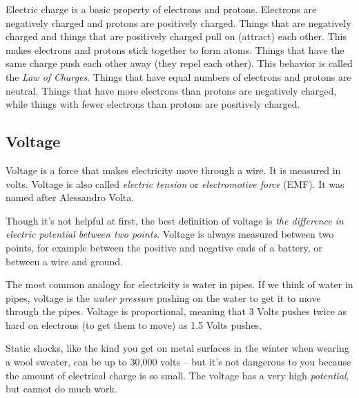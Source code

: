 Electric charge is a basic property of electrons and protons. Electrons are negatively charged and protons are positively charged. Things that are negatively charged and things that are positively charged pull on (attract) each other. This makes electrons and protons stick together to form atoms. Things that have the same charge push each other away (they repel each other). This behavior is called the \emph{Law of Charges}. Things that have equal numbers of electrons and protons are neutral. Things that have more electrons than protons are negatively charged, while things with fewer electrons than protons are positively charged. 



\subsection*{Voltage}

Voltage is a force that makes electricity move through a wire. It is measured in volts. Voltage is also called \emph{electric tension} or \emph{electromotive force} (EMF). It was named after Alessandro Volta.

Though it's not helpful at first, the best definition of voltage is \emph{the difference in electric potential between two points}. Voltage is always measured between two points, for example between the positive and negative ends of a battery, or between a wire and ground.

The most common analogy for electricity is water in pipes. If we think of water in pipes, voltage is the \emph{water pressure} pushing on the water to get it to move through the pipes. Voltage is proportional, meaning that 3 Volts pushes twice as hard on electrons (to get them to move) as 1.5 Volts pushes.

Static shocks, like the kind you get on metal surfaces in the winter when wearing a wool sweater, can be up to 30,000 volts -- but it's not dangerous to you because the amount of electrical charge is so small. The voltage has a very high \emph{potential}, but cannot do much work.

